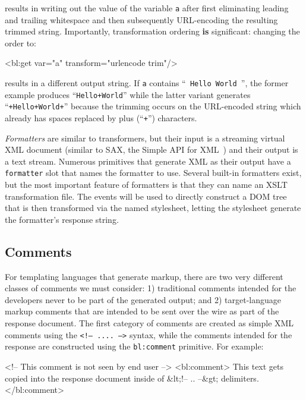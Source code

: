 \documentclass{www2003-submission}
\newcommand{\smtexttt}[1]{{\small\texttt{#1}}}
\newenvironment{smallverbatim}%
{\renewcommand{\baselinestretch}{1}\small\verbatim}%
{\renewcommand{\baselinestretch}{2}\endverbatim}
\begin{document}
\noindent results in writing out the value of the variable \smtexttt{a}
after first eliminating leading and trailing whitespace and then
subsequently URL-encoding the resulting trimmed string.  Importantly,
transformation ordering \textbf{is} significant: changing the order to:

\begin{smallverbatim}
<bl:get var="a" transform="urlencode trim"/>
\end{smallverbatim}

\noindent results in a different output string.  If \smtexttt{a} contains
``\smtexttt{ Hello World }'', the former example produces ``\smtexttt{Hello+World}'' while
the latter variant generates ``\smtexttt{+Hello+World+}'' because the
trimming occurs on the URL-encoded string which already has spaces
replaced by plus (``\smtexttt{+}'') characters.

\emph{Formatters} are similar to transformers, but their input is a streaming
virtual XML document (similar to SAX, the Simple API for XML~\cite{SAX})
and their output is a text stream.  Numerous primitives that generate
XML as their output have a \smtexttt{formatter} slot that names the
formatter to use. Several built-in formatters exist, but the most
important feature of formatters is that they can name an XSLT
transformation file.   The events will be used to directly construct a
DOM tree that is then transformed via the named stylesheet, letting the
stylesheet generate the formatter's response string.

\subsection{Comments}

For templating languages that generate markup, there are two very
different classes of comments we must consider: 1) traditional
comments intended for the developers never to be part of the generated
output; and 2) target-language markup comments that are intended to be
sent over the wire as part of the response document.  The first
category of comments are created as simple XML comments using the
\smtexttt{<!-- .... -->} syntax, while the comments intended for the
response are constructed using the \smtexttt{bl:comment} primitive.
For example:

\begin{smallverbatim}
<!-- This comment is not seen by end user -->
<bl:comment> 
This text gets copied into the response 
document inside of &lt;!-- .. --&gt; delimiters.
</bl:comment>
\end{smallverbatim}
\end{document}

